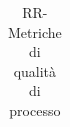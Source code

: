 \begin{longtable}{|>{\centering}m{5cm}|c|c|c|c|c|}
\caption{RR-Metriche di qualità di processo}
\end{longtable}

